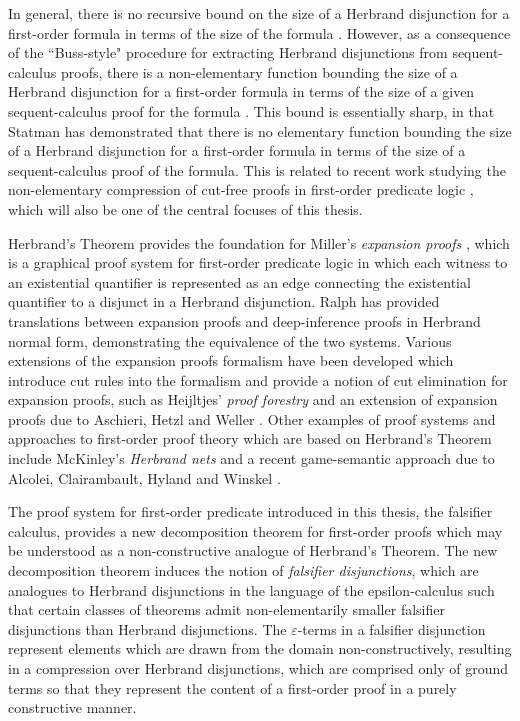 \documentclass[10pt]{article}
\theoremstyle{definition}\newtheorem{remark}[theorem]{Remark}
\theoremstyle{definition}\newtheorem{example}[theorem]{Example}
\theoremstyle{definition}\newtheorem{definition}[theorem]{Definition}
\begin{document}
	In general, there is no recursive bound on the size of a Herbrand disjunction for a first-order formula in terms of the size of the formula \cite{BussHerbrand}. However, as a consequence of the ``Buss-style" procedure for extracting Herbrand disjunctions from sequent-calculus proofs, there is a non-elementary function bounding the size of a Herbrand disjunction for a first-order formula in terms of the size of a given sequent-calculus proof for the formula \cite{BussHerbrand}. This bound is essentially sharp, in that Statman \cite{StatmanLowerBounds} has demonstrated that there is no elementary function bounding the size of a Herbrand disjunction for a first-order formula in terms of the size of a sequent-calculus proof of the formula. This is related to recent work studying the non-elementary compression of cut-free proofs in first-order predicate logic \cite{BaazSkolemization, BaazUnsoundInferences, BaazLolicEpsilonShorterProofs}, which will also be one of the central focuses of this thesis.
	
	Herbrand's Theorem provides the foundation for Miller's \textit{expansion proofs} \cite{MillerExpansionProofs}, which is a graphical proof system for first-order predicate logic in which each witness to an existential quantifier is represented as an edge connecting the existential quantifier to a disjunct in a Herbrand disjunction. Ralph \cite{BenThesis, RalphExpansionProofs} has provided translations between expansion proofs and deep-inference proofs in Herbrand normal form, demonstrating the equivalence of the two systems. Various extensions of the expansion proofs formalism have been developed which introduce cut rules into the formalism and provide a notion of cut elimination for expansion proofs, such as Heijltjes' \textit{proof forestry} \cite{HeijltjesProofForestry, WillemThesis} and an extension of expansion proofs due to Aschieri, Hetzl and Weller \cite{AschieriHetzlWellerExpansionWithCut}. Other examples of proof systems and approaches to first-order proof theory which are based on Herbrand's Theorem include McKinley's \textit{Herbrand nets} \cite{McKinleyHerbrandNets} and a recent game-semantic approach due to Alcolei, Clairambault, Hyland and Winskel \cite{HylandTrueConcurrency}.
	
	The proof system for first-order predicate introduced in this thesis, the falsifier calculus, provides a new decomposition theorem for first-order proofs which may be understood as a non-constructive analogue of Herbrand's Theorem. The new decomposition theorem induces the notion of \textit{falsifier disjunctions}, which are analogues to Herbrand disjunctions in the language of the epsilon-calculus such that certain classes of theorems admit non-elementarily smaller falsifier disjunctions than Herbrand disjunctions. The $\varepsilon$-terms in a falsifier disjunction represent elements which are drawn from the domain non-constructively, resulting in a compression over Herbrand disjunctions, which are comprised only of ground terms so that they represent the content of a first-order proof in a purely constructive manner.
	
\end{document}
